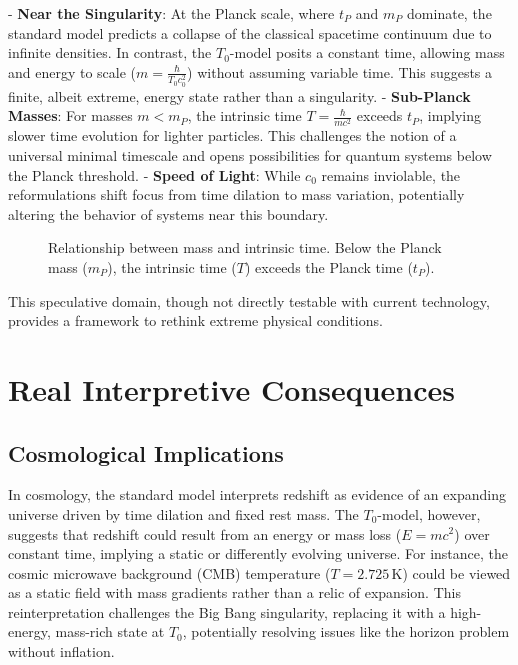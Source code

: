 \documentclass[a4paper,12pt]{article}
\begin{document}
	- \textbf{Near the Singularity}: At the Planck scale, where \( t_P \) and \( m_P \) dominate, the standard model predicts a collapse of the classical spacetime continuum due to infinite densities. In contrast, the \( T_0 \)-model posits a constant time, allowing mass and energy to scale (\( m = \frac{\hbar}{T_0 c_0^2} \)) without assuming variable time. This suggests a finite, albeit extreme, energy state rather than a singularity.
	- \textbf{Sub-Planck Masses}: For masses \( m < m_P \), the intrinsic time \( T = \frac{\hbar}{m c^2} \) exceeds \( t_P \), implying slower time evolution for lighter particles. This challenges the notion of a universal minimal timescale and opens possibilities for quantum systems below the Planck threshold.
	- \textbf{Speed of Light}: While \( c_0 \) remains inviolable, the reformulations shift focus from time dilation to mass variation, potentially altering the behavior of systems near this boundary.
	
	\begin{figure}[h]
		\centering
		\caption{Relationship between mass and intrinsic time. Below the Planck mass ($m_P$), the intrinsic time ($T$) exceeds the Planck time ($t_P$).}
	\end{figure}
	
	This speculative domain, though not directly testable with current technology, provides a framework to rethink extreme physical conditions.
	
	\section{Real Interpretive Consequences}
	
	\subsection{Cosmological Implications}
	In cosmology, the standard model interprets redshift as evidence of an expanding universe driven by time dilation and fixed rest mass. The \( T_0 \)-model, however, suggests that redshift could result from an energy or mass loss (\( E = m c^2 \)) over constant time, implying a static or differently evolving universe. For instance, the cosmic microwave background (CMB) temperature (\( T = 2.725 \, \text{K} \)) could be viewed as a static field with mass gradients rather than a relic of expansion. This reinterpretation challenges the Big Bang singularity, replacing it with a high-energy, mass-rich state at \( T_0 \), potentially resolving issues like the horizon problem without inflation.
	
\end{document}
